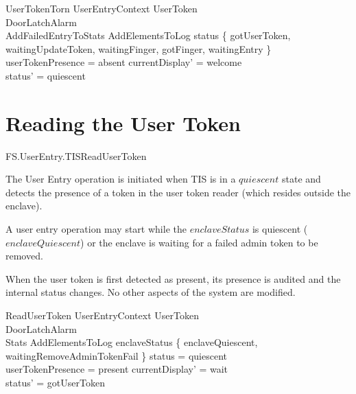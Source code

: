 \begin{schema}{UserTokenTorn}
        UserEntryContext
\also
	\Xi UserToken
\\      \Xi DoorLatchAlarm
\\      AddFailedEntryToStats
\also
        AddElementsToLog     
\where
        status \in \{ gotUserToken, waitingUpdateToken,
waitingFinger, gotFinger, waitingEntry \}
\\      userTokenPresence = absent
\also
        currentDisplay' = welcome
\\      status' = quiescent 
\end{schema}

\section{Reading the User Token}

\begin{traceunit}{FS.UserEntry.TISReadUserToken}
\end{traceunit}

The User Entry operation is initiated when TIS is in a $quiescent$ state
and detects the presence of
a token in the user token reader (which resides outside the enclave). 

A user entry operation may start while the $enclaveStatus$ is
quiescent ($enclaveQuiescent$) or the enclave is waiting for a failed
admin token to be removed.

When the user token is first detected as present, its presence is
audited and the internal status changes. 
No other aspects of the system are modified.

\begin{schema}{ReadUserToken}
        UserEntryContext
\also
        \Xi UserToken
\\	\Xi DoorLatchAlarm
\\      \Xi Stats
\also
        AddElementsToLog
\where
        enclaveStatus \in \{ enclaveQuiescent,
        waitingRemoveAdminTokenFail \}
\also
	status = quiescent
\\	userTokenPresence = present
\also
	currentDisplay' = wait
\\	status' = gotUserToken
\end{schema}

